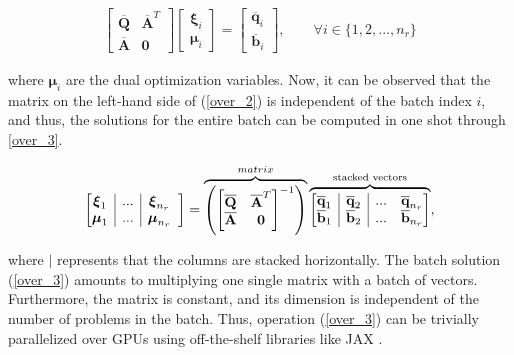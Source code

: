 \begin{align}
    \begin{bmatrix}
        \overline{\textbf{Q}} & \overline{\textbf{A}}^{T} \\ 
        \overline{\textbf{A}} & \textbf{0}
    \end{bmatrix} \begin{bmatrix}
        \boldsymbol{\xi}_{i}\\ \boldsymbol{\mu}_{i}
    \end{bmatrix} = \begin{bmatrix}
        \overline{\textbf{q}}_{i} \\ \overline{\textbf{b}}_{i}
    \end{bmatrix}, \qquad \forall i \in \{ 1,2,...,n_{r} \} \label{over_2}
\end{align}

\noindent where $\boldsymbol{\mu}_i$ are the dual optimization variables. Now, it can be observed that the matrix on the left-hand side of (\ref{over_2}) is independent of the batch index $i$, and thus, the solutions for the entire batch can be computed in one shot through \eqref{over_3}.

\begin{align}
\begin{bmatrix} 
\begin{array}{@{}c|c|cc@{}}
\boldsymbol{\xi}_{1} &...& \boldsymbol{\xi}_{n_{r}} \\ \boldsymbol{\mu}_{1} &...& \boldsymbol{\mu}_{n_{r}}
\end{array}
\end{bmatrix} =
    \overbrace{\left (\begin{bmatrix}
        \overline{\textbf{Q}} & \overline{\textbf{A}}^{T} \\ 
        \overline{\textbf{A}} & \textbf{0}
    \end{bmatrix}^{-1}\right )}^{matrix}
\overbrace{\begin{bmatrix}
\begin{array}{@{}c|c|cc@{}}
    \overline{\textbf{q}}_{1} & \overline{\textbf{q}}_{2}& ... & \overline{\textbf{q}}_{n_{r}}  \\
    \overline{\textbf{b}}_1 & \overline{\textbf{b}}_2 & ... & \overline{\textbf{b}}_{n_{r}} 
    \end{array}\end{bmatrix}}^{\text{stacked vectors}},
    \label{over_3}
\end{align}

\noindent where $|$ represents that the columns are stacked horizontally. The batch solution (\ref{over_3}) amounts to multiplying one single matrix with a batch of vectors. Furthermore, the matrix is constant, and its dimension is independent of the number of problems in the batch. Thus, operation (\ref{over_3}) can be trivially parallelized over GPUs using off-the-shelf libraries like JAX \citep{bradbury2020jax}.

